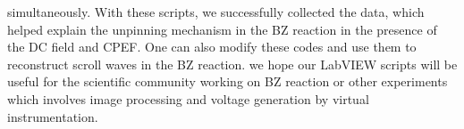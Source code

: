 \documentclass[journal=jacsat,manuscript=article]{achemso}
\begin{document}
simultaneously. With these scripts, we successfully collected the
data, which helped explain the unpinning mechanism in the BZ reaction
in the presence of the DC field and CPEF. One can also modify these
codes and use them to reconstruct scroll waves in the BZ reaction.
we hope our LabVIEW scripts will be useful for the scientific
community working on BZ reaction or other experiments which involves
image processing and voltage generation by virtual instrumentation.
\begin{acknowledgement}
\end{acknowledgement}

\begin{suppinfo}
\end{suppinfo}


\end{document}
